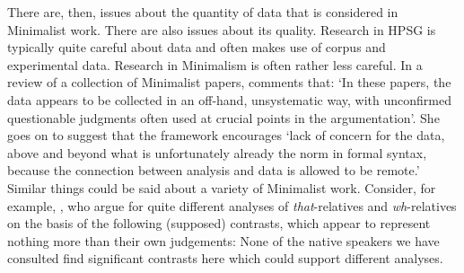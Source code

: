 \documentclass[output=paper]{langsci/langscibook}
\begin{document}
There are, then, issues about the quantity of data that is considered in Minimalist work. There are also issues about its quality. Research in HPSG is typically quite careful about data and often makes use of corpus and experimental data. Research in Minimalism is often rather less careful. In a review of a collection of Minimalist papers, \citet[434]{Bender2002a} comments that: `In these papers, the data appears to be collected in an off-hand, unsystematic way, with unconfirmed questionable judgments often used at crucial points in the argumentation'. She goes on to suggest that the framework encourages `lack of concern for the data, above and beyond what is unfortunately already the norm in formal syntax, because the connection between analysis and data is allowed to be remote.' Similar things could be said about a variety of Minimalist work. Consider, for example, \citet{AounLi.2003}, who argue for quite different analyses of \textit{that}-relatives and \textit{wh}-relatives on the basis of the following (supposed) contrasts, which appear to represent nothing more than their own judgements:
\eal
{}\label{ex:min-headway-that}
\label{ex:min-headway-which}
\zl
\eal
{}\label{ex:min-admire-that}
\label{ex:min-admire-which} 
\zl
\eal
{}\label{ex:min-picture-that}
\label{ex:min-picture-which} 
\zl
None of the native speakers we have consulted find significant contrasts here which could support different analyses. 
\end{document}
